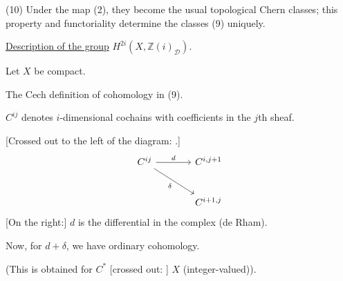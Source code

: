 (10) Under the map (2), they become the usual topological Chern classes;
this property and functoriality determine the classes (9) uniquely.

\underline{Description of the group} $H^{2i}(X,\mathbb{Z}(i)_{\mathcal D})$.

Let $X$ be compact.

The Cech definition of cohomology in (9).

$C^{ij}$ denotes $i$-dimensional cochains with coefficients in the $j$th sheaf.

[Crossed out to the left of the diagram:
.]
\begin{equation*}
\begin{tikzcd}[column sep=large,row sep=large]
C^{ij}\arrow[r,"d"]\arrow[dr,"\delta"'] & C^{i,j+1}\\
& C^{i+1,j}
\end{tikzcd}
\end{equation*}
[On the right:] $d$ is the differential in the complex (de Rham).

Now, for $d+\delta$, we have ordinary cohomology.

(This is obtained for $C^*$ [crossed out:
]
$X$ (integer-valued)).


